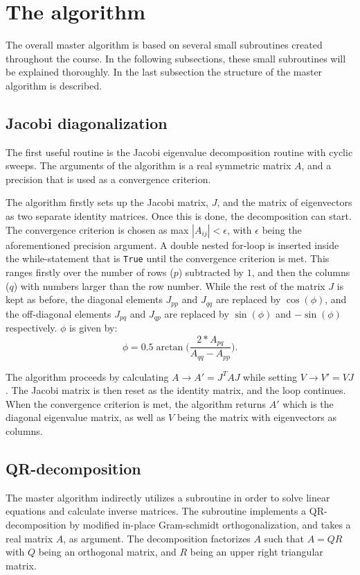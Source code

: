 \documentclass[12pt]{article}
\begin{document}
\section{The algorithm}\label{sec:algorithm}
The overall master algorithm is based on several small subroutines created throughout the course. In the following subsections, these small subroutines will be explained thoroughly. In the last subsection the structure of the master algorithm is described. 

\subsection*{Jacobi diagonalization}
The first useful routine is the Jacobi eigenvalue decomposition routine with cyclic sweeps. The arguments of the algorithm is a real symmetric matrix $A$, and a precision that is used as a convergence criterion.

The algorithm firstly sets up the Jacobi matrix, $J$, and the matrix of eigenvectors as two separate identity matrices. Once this is done, the decomposition can start. The convergence criterion is chosen as max $|A_{ij}| < \epsilon$, with $\epsilon$ being the aforementioned precision argument. A double nested for-loop is inserted inside the while-statement that is \texttt{True} until the convergence criterion is met. This ranges firstly over the number of rows ($p$) subtracted by $1$, and then the columns ($q$) with numbers larger than the row number. While the rest of the matrix $J$ is kept as before, the diagonal elements $J_{pp}$ and $J_{qq}$ are replaced by $\cos(\phi)$, and the off-diagonal elements $J_{pq}$ and $J_{qp}$ are replaced by $\sin(\phi)$ and $-\sin(\phi)$ respectively. $\phi$ is given by:
\begin{equation*}
    \phi = 0.5\arctan\bigg(\frac{2*A_{pq}}{A_{qq}-A_{pp}}\bigg).
\end{equation*}

The algorithm proceeds by calculating $A \rightarrow A' = J^TAJ$ while setting $V \rightarrow V'= VJ$. The Jacobi matrix is then reset as the identity matrix, and the loop continues. When the convergence criterion is met, the algorithm returns $A'$ which is the diagonal eigenvalue matrix, as well as $V$ being the matrix with eigenvectors as columns.

\subsection*{QR-decomposition}
The master algorithm indirectly utilizes a subroutine in order to solve linear equations and calculate inverse matrices. The subroutine implements a QR-decomposition by modified in-place Gram-schmidt orthogonalization, and takes a real matrix $A$, as argument. The decomposition factorizes $A$ such that $A = QR$ with $Q$ being an orthogonal matrix, and $R$ being an upper right triangular matrix.
\end{document}
